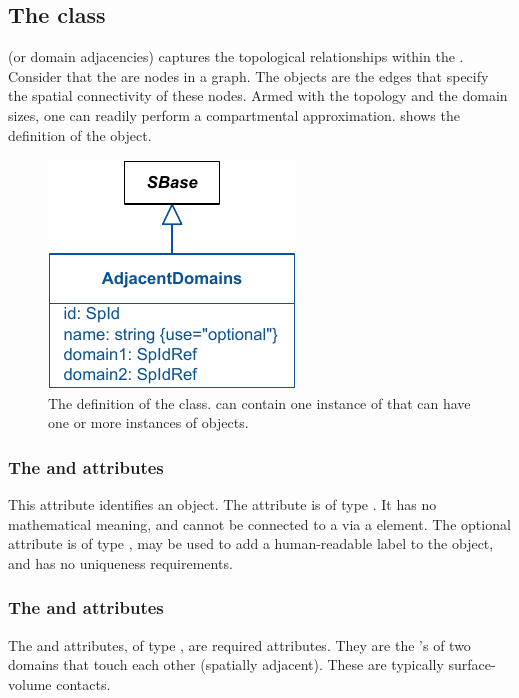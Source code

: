 \subsection{The  class}
\label{adjacentdomains-class}
\AdjacentDomains (or domain adjacencies) captures the topological relationships within the \Geometry.  Consider that the \Domains are nodes in a graph. The \AdjacentDomains objects are the edges that specify the spatial connectivity of these nodes.  Armed with the topology and the domain sizes, one can readily perform a compartmental approximation.   shows the definition of the \AdjacentDomains object.

\begin{figure}[ht]
  \includegraphics{figs/AdjacentDomains-uml}
  \caption{The definition of the \AdjacentDomains class. \Geometry can contain one instance of \ListOfAdjacentDomains that can have one or more instances of \AdjacentDomains objects.}
  \label{AdjacentDomains-uml}
\end{figure}

\subsubsection{The \fixttspace{} and \fixttspace{} attributes}
This attribute identifies an \AdjacentDomains object. The attribute is of type .  It has no mathematical meaning, and cannot be connected to a \Parameter via a \SpatialSymbolReference element.  The optional  attribute is of type , may be used to add a human-readable label to the object, and has no uniqueness requirements.

\subsubsection{The \fixttspace{} and  attributes}
The  and  attributes, of type , are required attributes. They are the 's of two domains that touch each other (spatially adjacent).  These are typically surface-volume contacts.

